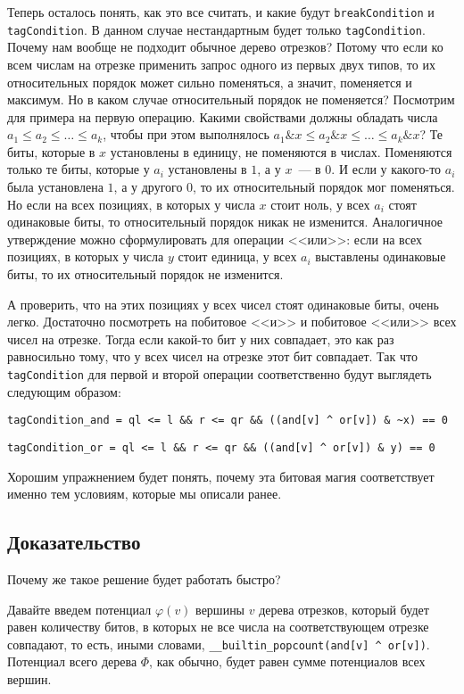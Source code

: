Теперь осталось понять, как это все считать, и какие будут \verb+breakCondition+ и \verb+tagCondition+. В данном случае нестандартным будет только \verb+tagCondition+. Почему нам вообще не подходит обычное дерево отрезков? Потому что если ко всем числам на отрезке применить запрос одного из первых двух типов, то их относительных порядок может сильно поменяться, а значит, поменяется и максимум. Но в каком случае относительный порядок не поменяется? Посмотрим для примера на первую операцию. Какими свойствами должны обладать числа $a_1 \le a_2 \le \ldots \le a_k$, чтобы при этом выполнялось $a_1 \& x \le a_2 \& x \le \ldots \le a_k \& x$? Те биты, которые в $x$ установлены в единицу, не поменяются в числах. Поменяются только те биты, которые у $a_i$ установлены в $1$, а у $x$~--- в $0$. И если у какого-то $a_i$ была установлена $1$, а у другого $0$, то их относительный порядок мог поменяться. Но если на всех позициях, в которых у числа $x$ стоит ноль, у всех $a_i$ стоят одинаковые биты, то относительный порядок никак не изменится. Аналогичное утверждение можно сформулировать для операции <<или>>: если на всех позициях, в которых у числа $y$ стоит единица, у всех $a_i$ выставлены одинаковые биты, то их относительный порядок не изменится.

А проверить, что на этих позициях у всех чисел стоят одинаковые биты, очень легко. Достаточно посмотреть на побитовое <<и>> и побитовое <<или>> всех чисел на отрезке. Тогда если какой-то бит у них совпадает, это как раз равносильно тому, что у всех чисел на отрезке этот бит совпадает. Так что \verb+tagCondition+ для первой и второй операции соответственно будут выглядеть следующим образом:

\verb+tagCondition_and = ql <= l && r <= qr && ((and[v] ^ or[v]) & ~x) == 0+

\verb+tagCondition_or = ql <= l && r <= qr && ((and[v] ^ or[v]) & y) == 0+

\begin{exercise}
    Хорошим упражнением будет понять, почему эта битовая магия соответствует именно тем условиям, которые мы описали ранее.
\end{exercise}



\subsection{Доказательство}

Почему же такое решение будет работать быстро?

Давайте введем потенциал $\varphi(v)$ вершины $v$ дерева отрезков, который будет равен количеству битов, в которых не все числа на соответствующем отрезке совпадают, то есть, иными словами, \verb+__builtin_popcount(and[v] ^ or[v])+. Потенциал всего дерева $\Phi$, как обычно, будет равен сумме потенциалов всех вершин.

